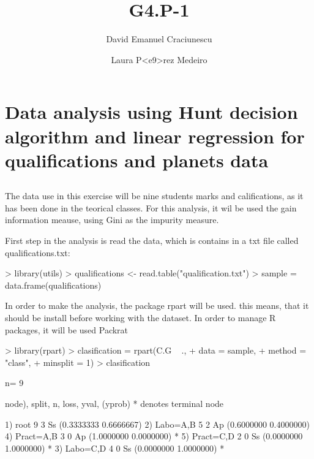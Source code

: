 \documentclass[a4paper]{article}
\title{G4.P-1}
\author{David Emanuel Craciunescu \and Laura P<e9>rez Medeiro}
\begin{document}


\maketitle


\section{Data analysis using Hunt decision algorithm and linear regression for qualifications and planets data}

  \subsection{}The data use in this exercise will be nine students marks and califications, as it has been done in the teorical classes. For this analysis, it wil be used the gain information meause, using Gini as the impurity measure.
 
  First step in the analysis is read the data, which is contains in a txt file called qualifications.txt:
 
\begin{Schunk}
\begin{Sinput}
> library(utils)
> qualifications <- read.table("qualification.txt")
> sample = data.frame(qualifications)
\end{Sinput}
\end{Schunk}

In order to make the analysis, the package rpart will be used. this means, that it should be install before working with the dataset. In order to manage R packages, it will be used Packrat

\begin{Schunk}
\begin{Sinput}
> library(rpart)
> clasification = rpart(C.G ~ .,
+                       data = sample,
+                       method = "class",
+                       minsplit = 1)
> clasification
\end{Sinput}
\begin{Soutput}
n= 9 

node), split, n, loss, yval, (yprob)
      * denotes terminal node

1) root 9 3 Ss (0.3333333 0.6666667)  
  2) Labo=A,B 5 2 Ap (0.6000000 0.4000000)  
    4) Pract=A,B 3 0 Ap (1.0000000 0.0000000) *
    5) Pract=C,D 2 0 Ss (0.0000000 1.0000000) *
  3) Labo=C,D 4 0 Ss (0.0000000 1.0000000) *
\end{Soutput}
\end{Schunk}
\end{document}
